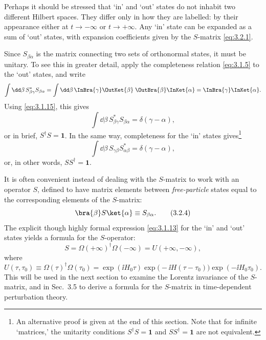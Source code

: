 Perhaps it should be stressed that `in' and `out' states do not inhabit two
different Hilbert spaces. They differ only in how they are labelled: by their
appearance either at $t\to-\infty$ or $t\to+\infty$. Any `in' state can be
expanded as a sum of `out' states, with expansion coefficients given by the
$S$-matrix \eqref{eq:3.2.1}.

Since $S_{\beta\alpha}$ is the matrix connecting two sets of orthonormal
states, it must be unitary. To see this in greater detail, apply the
completeness relation \eqref{eq:3.1.5} to the `out' states, and write
\[
\int \dd\beta\,S^*_{\beta\gamma}S_{\beta\alpha}
=\int \dd\beta\,
\InBra{\gamma}\OutKet{\beta}
\;
\OutBra{\beta}\InKet{\alpha}
=\InBra{\gamma}\InKet{\alpha}.
\]
Using \eqref{eq:3.1.15}, this gives
\begin{equation}
\int \dd\beta\,S^*_{\beta\gamma}S_{\beta\alpha}
=\delta(\gamma-\alpha),
\tag{3.2.2}\label{eq:3.2.2}
\end{equation}
or in brief, $S^\dagger S=\mathbf{1}$. In the same way, completeness for the
`in' states gives\footnote{An alternative proof is given at the end of this
section. Note that for infinite `matrices,' the unitarity conditions
$S^\dagger S=\mathbf{1}$ and $SS^\dagger=\mathbf{1}$ are not equivalent.}
\begin{equation}
\int \dd\beta\,S_{\gamma\beta}S^*_{\alpha\beta}
=\delta(\gamma-\alpha),
\tag{3.2.3}\label{eq:3.2.3}
\end{equation}
or, in other words, $SS^\dagger=\mathbf{1}$.

It is often convenient instead of dealing with the $S$-matrix to work with
an operator $S$, defined to have matrix elements between \textit{free-particle}
states equal to the corresponding elements of the $S$-matrix:
\begin{equation}
\bra{\beta}S\ket{\alpha}\equiv S_{\beta\alpha}.
\tag{3.2.4}\label{eq:3.2.4}
\end{equation}
The explicit though highly formal expression \eqref{eq:3.1.13} for the `in' and `out'
states yields a formula for the $S$-operator:
\begin{equation}
S=\Omega(+\infty)^\dagger\Omega(-\infty)=U(+\infty,-\infty),
\tag{3.2.5}\label{eq:3.2.5}
\end{equation}
where
\begin{equation}
U(\tau,\tau_0)\equiv\Omega(\tau)^\dagger\Omega(\tau_0)
=\exp(\ii H_0\tau)\exp\bigl(-\ii H(\tau-\tau_0)\bigr)
\exp(-\ii H_0\tau_0).
\tag{3.2.6}\label{eq:3.2.6}
\end{equation}
This will be used in the next section to examine the Lorentz invariance of the
$S$-matrix, and in Sec.~3.5 to derive a formula for the $S$-matrix in
time-dependent perturbation theory.

